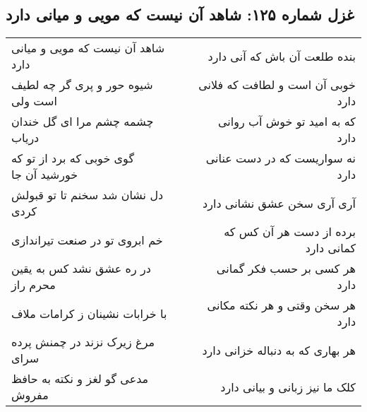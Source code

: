 \begin{center}
\section*{غزل شماره ۱۲۵: شاهد آن نیست که مویی و میانی دارد}
\label{sec:sh125}
\begin{longtable}{l p{0.5cm} r}
شاهد آن نیست که مویی و میانی دارد
&&
بنده طلعت آن باش که آنی دارد
\\
شیوه حور و پری گر چه لطیف است ولی
&&
خوبی آن است و لطافت که فلانی دارد
\\
چشمه چشم مرا ای گل خندان دریاب
&&
که به امید تو خوش آب روانی دارد
\\
گوی خوبی که برد از تو که خورشید آن جا
&&
نه سواریست که در دست عنانی دارد
\\
دل نشان شد سخنم تا تو قبولش کردی
&&
آری آری سخن عشق نشانی دارد
\\
خم ابروی تو در صنعت تیراندازی
&&
برده از دست هر آن کس که کمانی دارد
\\
در ره عشق نشد کس به یقین محرم راز
&&
هر کسی بر حسب فکر گمانی دارد
\\
با خرابات نشینان ز کرامات ملاف
&&
هر سخن وقتی و هر نکته مکانی دارد
\\
مرغ زیرک نزند در چمنش پرده سرای
&&
هر بهاری که به دنباله خزانی دارد
\\
مدعی گو لغز و نکته به حافظ مفروش
&&
کلک ما نیز زبانی و بیانی دارد
\\
\end{longtable}
\end{center}
